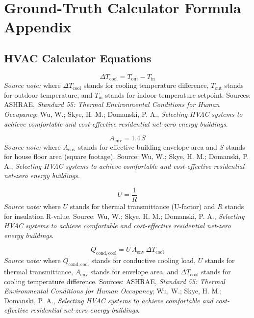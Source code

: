 \documentclass[12pt]{article}
\begin{document}
\section{Ground-Truth Calculator Formula Appendix}
\label{app:gt-formulas}

\subsection{HVAC Calculator Equations}

\begin{equation}
\label{eq:hvac_cooling_delta_t}
\Delta T_{\mathrm{cool}} = T_{\mathrm{out}} - T_{\mathrm{in}}
\end{equation}
\noindent\textit{Source note:} where $\Delta T_{\mathrm{cool}}$ stands for cooling temperature difference, $T_{\mathrm{out}}$ stands for outdoor temperature, and $T_{\mathrm{in}}$ stands for indoor temperature setpoint. Sources: ASHRAE, \emph{Standard 55: Thermal Environmental Conditions for Human Occupancy}; Wu, W.; Skye, H. M.; Domanski, P. A., \emph{Selecting HVAC systems to achieve comfortable and cost-effective residential net-zero energy buildings}.

\begin{equation}
\label{eq:hvac_envelope_area}
A_{\mathrm{env}} = 1.4\,S
\end{equation}
\noindent\textit{Source note:} where $A_{\mathrm{env}}$ stands for effective building envelope area and $S$ stands for house floor area (square footage). Source: Wu, W.; Skye, H. M.; Domanski, P. A., \emph{Selecting HVAC systems to achieve comfortable and cost-effective residential net-zero energy buildings}.

\begin{equation}
\label{eq:hvac_u_factor}
U = \frac{1}{R}
\end{equation}
\noindent\textit{Source note:} where $U$ stands for thermal transmittance (U-factor) and $R$ stands for insulation R-value. Source: Wu, W.; Skye, H. M.; Domanski, P. A., \emph{Selecting HVAC systems to achieve comfortable and cost-effective residential net-zero energy buildings}.

\begin{equation}
\label{eq:hvac_conduction_cool}
Q_{\mathrm{cond,cool}} = U\,A_{\mathrm{env}}\,\Delta T_{\mathrm{cool}}
\end{equation}
\noindent\textit{Source note:} where $Q_{\mathrm{cond,cool}}$ stands for conductive cooling load, $U$ stands for thermal transmittance, $A_{\mathrm{env}}$ stands for envelope area, and $\Delta T_{\mathrm{cool}}$ stands for cooling temperature difference. Sources: ASHRAE, \emph{Standard 55: Thermal Environmental Conditions for Human Occupancy}; Wu, W.; Skye, H. M.; Domanski, P. A., \emph{Selecting HVAC systems to achieve comfortable and cost-effective residential net-zero energy buildings}.
\end{document}
